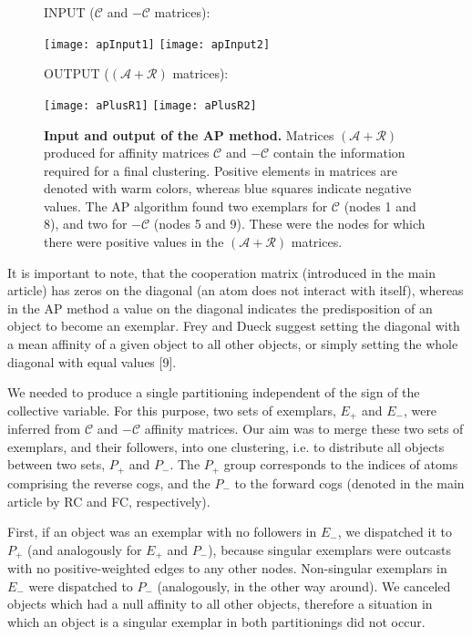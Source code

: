 \documentclass[a4paper,11pt,twoside]{book}%
\begin{document}
\begin{appendices}
\begin{figure}[h!]
\centering
INPUT ($\mathcal{C}$ and $-\mathcal{C}$ matrices):

\texttt{[image: apInput1]}%
\texttt{[image: apInput2]}

OUTPUT ($(\mathcal{A}+\mathcal{R})$ matrices):

\texttt{[image: aPlusR1]}%
\texttt{[image: aPlusR2]}
\caption{
{\bf Input and output of the AP method.}
Matrices $(\mathcal{A}+\mathcal{R})$ produced for affinity matrices $\mathcal{C}$ and $-\mathcal{C}$ contain the information required for a final clustering.
Positive elements in matrices are denoted with warm colors, whereas blue squares indicate negative values.
The AP algorithm found two exemplars for $\mathcal{C}$ (nodes 1 and 8), and two for $-\mathcal{C}$ (nodes 5 and 9).
These were the nodes for which there were positive values in the $(\mathcal{A}+\mathcal{R})$ matrices.
}
\label{fig:apExample}
\end{figure}

It is important to note, that the cooperation matrix (introduced in the main article) has zeros on the diagonal (an atom does not interact with itself), whereas in the AP method a value on the diagonal indicates the predisposition of an object to become an exemplar.
Frey and Dueck suggest setting the diagonal with a mean affinity of a given object to all other objects, or simply setting the whole diagonal with equal values [9].

We needed to produce a single partitioning independent of the sign of the collective variable.
For this purpose, two sets of exemplars, $E_+$ and $E_-$, were inferred from $\mathcal{C}$ and $-\mathcal{C}$ affinity matrices.
Our aim was to merge these two sets of exemplars, and their followers, into one clustering, i.e. to distribute all objects between two sets, $P_+$ and $P_-$.
The $P_+$ group corresponds to the indices of atoms comprising the reverse cogs, and the $P_-$ to the forward cogs (denoted in the main article by RC and FC, respectively).

First, if an object was an exemplar with no followers in $E_-$, we dispatched it to $P_+$ (and analogously for $E_+$ and $P_-$), because singular exemplars were outcasts with no positive-weighted edges to any other nodes.
Non-singular exemplars in $E_-$ were dispatched to $P_-$ (analogously, in the other way around).
We canceled objects which had a null affinity to all other objects, therefore a situation in which an object is a singular exemplar in both partitionings did not occur.


\end{appendices}
\end{document}

